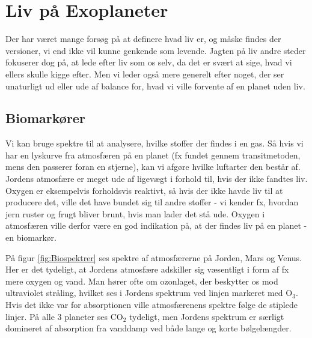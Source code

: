 \section{Liv på Exoplaneter} \label{sec:liv}

Der har været mange forsøg på at definere hvad liv er, og måske findes der versioner, vi end ikke vil kunne genkende som levende. Jagten på liv andre steder fokuserer dog på, at lede efter liv som os selv, da det er svært at sige, hvad vi ellers skulle kigge efter. Men vi leder også mere generelt efter noget, der ser unaturligt ud eller ude af balance for, hvad vi ville forvente af en planet uden liv.

\subsection*{Biomarkører}

Vi kan bruge spektre til at analysere, hvilke stoffer der findes i en gas. Så hvis vi har en lyskurve fra atmosfæren på en planet (fx fundet gennem transitmetoden, mens den passerer foran en stjerne), kan vi afgøre hvilke luftarter den består af. Jordens atmosfære er meget ude af ligevægt i forhold til, hvis der ikke fandtes liv. Oxygen er eksempelvis forholdsvis reaktivt, så hvis der ikke havde liv til at producere det, ville det have bundet sig til andre stoffer - vi kender fx, hvordan jern ruster og frugt bliver brunt, hvis man lader det stå ude. Oxygen i atmosfæren ville derfor være en god indikation på, at der findes liv på en planet - en biomarkør.

På figur \ref{fig:Biospektrer} ses spektre af atmosfærerne på Jorden, Mars og Venus. Her er det tydeligt, at Jordens atmosfære adskiller sig væsentligt i form af fx mere oxygen og vand. Man hører ofte om ozonlaget, der beskytter os mod ultraviolet stråling, hvilket ses i Jordens spektrum ved linjen markeret med O$_3$. Hvis det ikke var for absorptionen ville atmosfærenens spektre følge de stiplede linjer. På alle 3 planeter ses CO$_2$ tydeligt, men Jordens spektrum er særligt domineret af absorption fra vanddamp ved både lange og korte bølgelængder.

